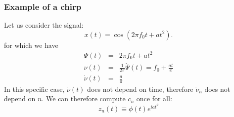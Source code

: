 \documentclass{article}
\begin{document}






\subsubsection{Example of a chirp}
Let us consider the signal:
\begin{equation}
    x(t) = \cos\left( 2 \pi f_0 t + a t^{2} \right).
\end{equation}
for which we have 
\begin{eqnarray*}
    \Psi(t) & = & 2 \pi f_0 t + a t^{2} \nonumber \\
    \nu(t) & = & \frac{1}{2\pi} \dot{\Psi}(t) = f_0 + \frac{a t}{\pi} \nonumber \\
    \dot{\nu}(t) & = & \frac{a}{\pi}
\end{eqnarray*}
In this specific case, $\dot{\nu}(t)$ does not depend on time, therefore $\dot{\nu}_{n}$ does not depend on $n$. We can therefore compute $c_n$ once for all:
\begin{equation*}
z_{n}(t) \equiv \phi(t) e^{i a  t^2}
\end{equation*}
\end{document}
